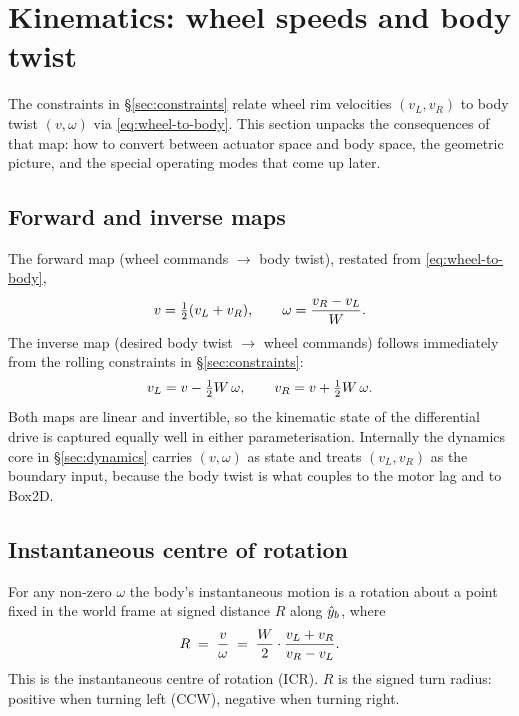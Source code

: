 \section{Kinematics: wheel speeds and body twist}
\label{sec:kinematics}

The constraints in \S\ref{sec:constraints} relate wheel rim velocities $(v_L, v_R)$ to body twist $(v, \omega)$ via \eqref{eq:wheel-to-body}. This section unpacks the consequences of that map: how to convert between actuator space and body space, the geometric picture, and the special operating modes that come up later.

\subsection{Forward and inverse maps}

The forward map (wheel commands $\to$ body twist), restated from \eqref{eq:wheel-to-body},
\begin{equation}
    v = \tfrac{1}{2}(v_L + v_R),
    \qquad
    \omega = \frac{v_R - v_L}{W}.
    \label{eq:fwd-kin}
\end{equation}
The inverse map (desired body twist $\to$ wheel commands) follows immediately from the rolling constraints in \S\ref{sec:constraints}:
\begin{equation}
    v_L = v - \tfrac{1}{2}W\,\omega,
    \qquad
    v_R = v + \tfrac{1}{2}W\,\omega.
    \label{eq:inv-kin}
\end{equation}
Both maps are linear and invertible, so the kinematic state of the differential drive is captured equally well in either parameterisation. Internally the dynamics core in \S\ref{sec:dynamics} carries $(v, \omega)$ as state and treats $(v_L, v_R)$ as the boundary input, because the body twist is what couples to the motor lag and to Box2D.

\subsection{Instantaneous centre of rotation}

For any non-zero $\omega$ the body's instantaneous motion is a rotation about a point fixed in the world frame at signed distance $R$ along $\hat{y}_{b}$, where
\begin{equation}
    R \;=\; \frac{v}{\omega} \;=\; \frac{W}{2}\cdot\frac{v_L + v_R}{v_R - v_L}.
    \label{eq:icr}
\end{equation}
This is the instantaneous centre of rotation (ICR). $R$ is the signed turn radius: positive when turning left (CCW), negative when turning right.


